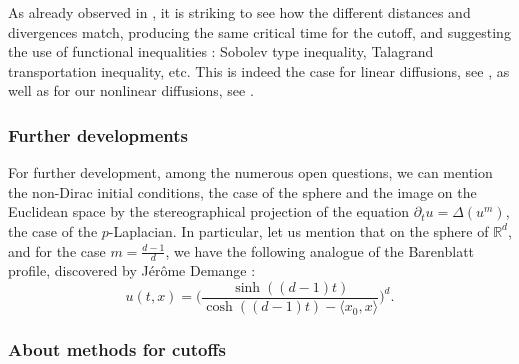 \documentclass[10pt,reqno]{amsart}
\numberwithin{equation}{section}
\begin{document}
As already observed in \cite{MR4528974}, it is striking to see how the different distances and divergences match, producing the same critical time for the cutoff, and suggesting the use of functional inequalities : Sobolev type inequality, Talagrand transportation inequality, etc. This is indeed the case for linear diffusions, see \cite{chafathi}, as well as for our nonlinear diffusions, see \cite[Proposition 5.1 and Theorem 5.2]{MR2824568}. 

\subsubsection{Further developments}

For further development, among the numerous open questions, we can mention the non-Dirac initial conditions, the case of the sphere and the image on the Euclidean space by the stereographical projection of the equation $\partial_t u=\Delta(u^m)$, the case of the $p$-Laplacian.
In particular, let us mention that on the sphere of $\mathbb{R}^d$, and for the case $m=\frac{d-1}{d}$, we have the following analogue of the Barenblatt profile, discovered by Jérôme Demange \cite[p.~597]{MR2381156} :
\begin{equation}
    u(t,x)=\Bigr(\frac{\sinh((d-1)t)}{\cosh((d-1)t)-\langle x_0,x\rangle}\Bigr)^d.
\end{equation}

\subsubsection{About methods for cutoffs}
\end{document}
